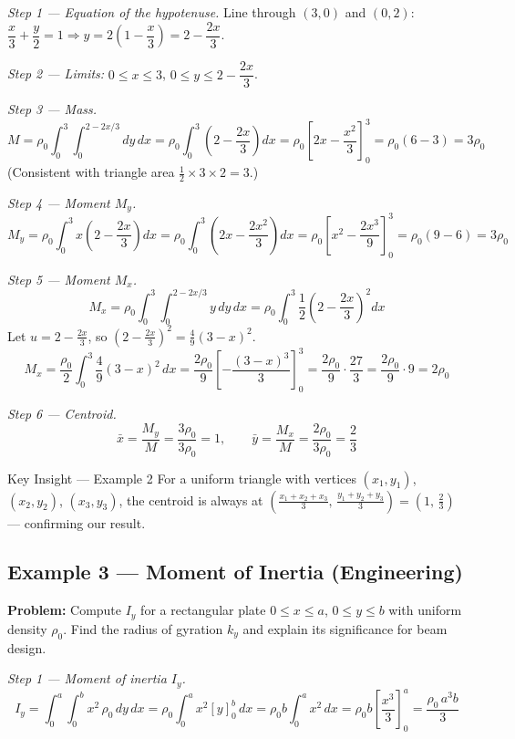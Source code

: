\documentclass[12pt,a4paper]{article}
\begin{document}
\textit{Step 1 --- Equation of the hypotenuse.}
Line through \((3,0)\) and \((0,2)\): \(\dfrac{x}{3} + \dfrac{y}{2} = 1 \Rightarrow y = 2\left(1 - \dfrac{x}{3}\right) = 2 - \dfrac{2x}{3}\).

\textit{Step 2 --- Limits:} \(0 \leq x \leq 3\), \(0 \leq y \leq 2 - \dfrac{2x}{3}\).

\textit{Step 3 --- Mass.}
\[
M = \rho_0 \int_0^3 \int_0^{2 - 2x/3} dy\,dx
= \rho_0 \int_0^3 \left(2 - \frac{2x}{3}\right) dx
= \rho_0 \left[2x - \frac{x^2}{3}\right]_0^3
= \rho_0 \left(6 - 3\right) = 3\rho_0
\]
(Consistent with triangle area \(\tfrac{1}{2}\times3\times2=3\).)

\textit{Step 4 --- Moment \(M_y\).}
\[
M_y = \rho_0 \int_0^3 x\left(2 - \frac{2x}{3}\right) dx
= \rho_0 \int_0^3 \left(2x - \frac{2x^2}{3}\right) dx
= \rho_0 \left[x^2 - \frac{2x^3}{9}\right]_0^3
= \rho_0\!\left(9 - 6\right) = 3\rho_0
\]

\textit{Step 5 --- Moment \(M_x\).}
\[
M_x = \rho_0 \int_0^3 \int_0^{2-2x/3} y\,dy\,dx
= \rho_0 \int_0^3 \frac{1}{2}\left(2 - \frac{2x}{3}\right)^2 dx
\]
Let \(u = 2 - \tfrac{2x}{3}\), so \(\left(2-\tfrac{2x}{3}\right)^2 = \tfrac{4}{9}(3-x)^2\).
\[
M_x = \frac{\rho_0}{2} \int_0^3 \frac{4}{9}(3-x)^2\,dx
= \frac{2\rho_0}{9} \left[-\frac{(3-x)^3}{3}\right]_0^3
= \frac{2\rho_0}{9} \cdot \frac{27}{3}
= \frac{2\rho_0}{9} \cdot 9 = 2\rho_0
\]

\textit{Step 6 --- Centroid.}
\[
\bar{x} = \frac{M_y}{M} = \frac{3\rho_0}{3\rho_0} = 1, \qquad
\bar{y} = \frac{M_x}{M} = \frac{2\rho_0}{3\rho_0} = \frac{2}{3}
\]

\begin{learnbox}{Key Insight --- Example 2}
For a uniform triangle with vertices \((x_1,y_1)\), \((x_2,y_2)\), \((x_3,y_3)\), the centroid is always at \(\left(\tfrac{x_1+x_2+x_3}{3},\, \tfrac{y_1+y_2+y_3}{3}\right) = (1,\, \tfrac{2}{3})\) --- confirming our result.
\end{learnbox}

\subsection*{Example 3 --- Moment of Inertia (Engineering)}

\textbf{Problem:} Compute \(I_y\) for a rectangular plate \(0 \leq x \leq a\), \(0 \leq y \leq b\) with uniform density \(\rho_0\). Find the radius of gyration \(k_y\) and explain its significance for beam design.

\textit{Step 1 --- Moment of inertia \(I_y\).}
\[
I_y = \int_0^a \int_0^b x^2\,\rho_0\,dy\,dx
= \rho_0 \int_0^a x^2 [y]_0^b\,dx
= \rho_0 b \int_0^a x^2\,dx
= \rho_0 b \left[\frac{x^3}{3}\right]_0^a
= \frac{\rho_0\, a^3 b}{3}
\]
\end{document}
